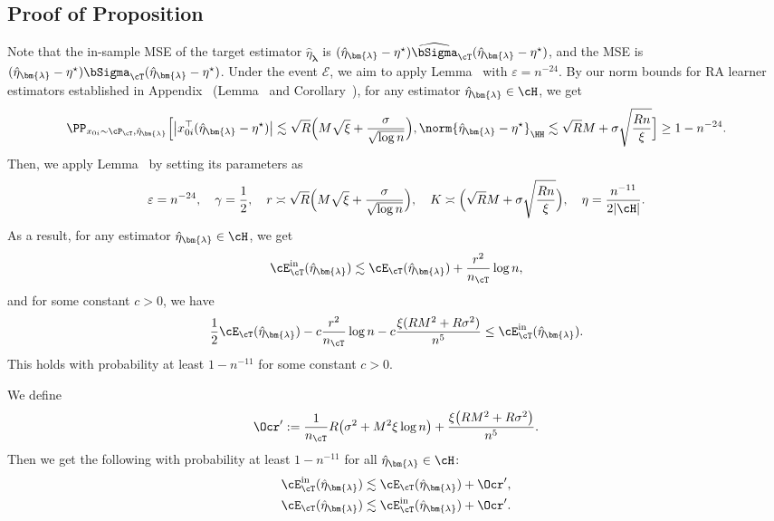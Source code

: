 \documentclass[12pt,a4paper,pdftex,onepage]{article}
\newcommand{\inn}{\operatorname{in}}
\newcommand{\Sighat}{\widehat{{\bSigma}}}
\newcommand{\sig}{\sigma}
\newcommand{\event}{\mathscr{E}}
\begin{document}
\subsection{Proof of Proposition~}
Note that the in-sample MSE of the target estimator \(\hat{\eta}_{\bm{\lambda}}\) is \((\hat{\eta}_{\bm{\lambda}}-\eta^\star)\Sighat_{\cT} (\hat{\eta}_{\bm{\lambda}}-\eta^\star)\), and the MSE is \((\hat{\eta}_{\bm{\lambda}}-\eta^\star)\bSigma_{\cT} (\hat{\eta}_{\bm{\lambda}}-\eta^\star)\).
Under the event \(\event\), we aim to apply Lemma~ with $\varepsilon = n^{-24}$. 
By our norm bounds for RA learner estimators established in Appendix~ (Lemma~ and Corollary~), for any estimator $\hat{\eta}_{\bm{\lambda}} \in \cH$, we get 
\begin{align*}
\PP_{x_{0i} \sim \cP_\cT, \hat
{\eta}_{\bm{\lambda}}}\Bigl[ \bigl|x_{0i}^\top (\hat{\eta}_{\bm{\lambda}}-\eta^\star)\bigr| \lesssim 
\sqrt{R}\Bigl(M \sqrt{\xi} + \frac{\sigma }{\sqrt{\log n}}\Bigr) 
, \norm{\hat{\eta}_{\bm{\lambda}}-\eta^\star}_{\HH} \lesssim \sqrt{R}   M + \sigma  \sqrt{\frac{Rn }{\xi}}  \Bigr] \geq 1- n^{-24}.
\end{align*}   
Then, we apply Lemma~ by setting its parameters as 
\[
\varepsilon = n^{-24}, \quad
\gamma = \frac{1}{2}, \quad
r \asymp \sqrt{R}\Bigl(M \sqrt{\xi} + \frac{\sig}{\sqrt{\log n}}\Bigr), \quad
K \asymp \Bigl(\sqrt{R}  M + \sigma \sqrt{\frac{Rn}{\xi}}\Bigr), \quad
\eta = \frac{n^{-11}}{2|\cH|}.
\]
As a result, for any estimator $\hat{\eta}_{\bm{\lambda}} \in \cH$, we get 
\begin{align*}
\cE^{\inn}_\cT(\hat{\eta}_{\bm{\lambda}}) \lesssim  \cE_\cT(\hat{\eta}_{\bm{\lambda}}) + \frac{r^2}{n_{\cT}}\log n ,
\end{align*}
and for some constant \(c>0\), we have
\begin{align*}
\frac{1}{2}\cE_\cT(\hat{\eta}_{\bm{\lambda}}) - c\frac{r^2}{n_{\cT}}\log n - c\frac{\xi(R M^2 +R\sig^2)}{n^5} \leq \cE_\cT^{\inn}(\hat{\eta}_{\bm{\lambda}}).
\end{align*}
This holds with probability at least \(1- n^{-11}\) for some constant \(c>0\).

We define 
\[
\Ocr' :=  \frac{1}{n_\cT}R \bigl(\sig^2 + M^2 \xi \log n\bigr)+\frac{\xi\bigl(R M^2 +R\sig^2\bigr)}{n^5}.
\]
Then we get the following with probability at least \(1-n^{-11}\) for all \(\hat{\eta}_{\bm{\lambda}} \in \cH\):
\begin{align*}
&\cE_{\cT}^{\inn}(\hat{\eta}_{\bm{\lambda}}) \lesssim \cE_\cT(\hat{\eta}_{\bm{\lambda}}) +\Ocr',\\
&\cE_{\cT}(\hat{\eta}_{\bm{\lambda}}) \lesssim  \cE_{\cT}^{\inn}(\hat{\eta}_{\bm{\lambda}}) +\Ocr'.
\end{align*}
\end{document}
